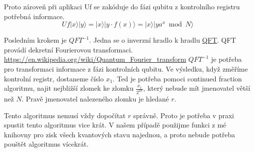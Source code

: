 \documentclass[11pt]{article}
\begin{document}
Proto zároveň při aplikaci Uf se zakóduje do fázi qubitu z kontrolního registru potřebná informace.
$$Uf|x\rangle|y\rangle = |x\rangle|y \cdot f(x)\rangle = |x\rangle|ya^x \bmod N \rangle$$
\par Posledním krokem je $QFT^{-1}$.
Jedna se o inverzní hradlo k hradlu \hyperref[sec:qft]{QFT}.
QFT provádí dekretní Fourierovou transformaci.
\url{https://en.wikipedia.org/wiki/Quantum_Fourier_transform}
$QFT^{-1}$ je potřeba pro transformaci informace z fázi kontrolních qubitu.
Ve výsledku, když změříme kontrolní registr, dostaneme číslo $x_1$.
Ted je potřeba pomoci continued fraction algoritmu, najit nejbližší zlomek ke zlomku $\frac{x_1}{2^{2n}}$, který nebude mít jmenovatel větší než $N$.
Pravě jmenovatel nalezeného zlomku je hledané $r$.
\par Tento algoritmus nemusí vždy dopočítat $r$ správně.
Proto je potřeba v praxi spustit tento algoritmus vice krát.
V našem případě použijme funkci z mé knihovny pro zisk všech kvantových stavu najednou, a proto nebude potřeba pouštět algoritmus vícekrát.
\end{document}
